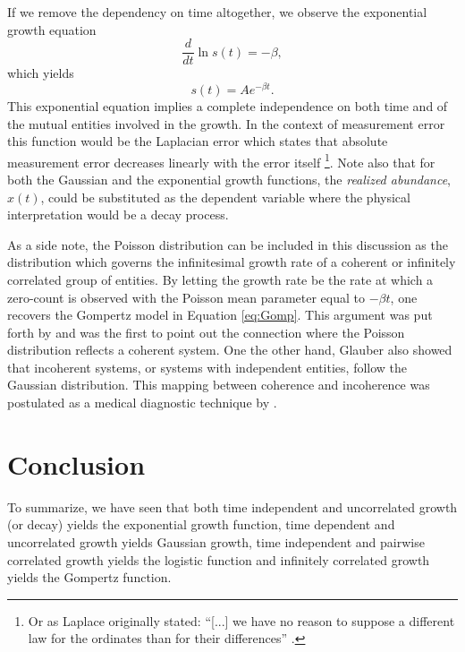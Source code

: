 \documentclass{article}
\begin{document}
If we remove the dependency on time altogether, we observe the exponential growth equation
\begin{equation}
  \frac{d}{dt}\ln s(t) = - \beta,
\end{equation}
which yields 
\begin{equation}
  s(t) = A e^{ - \beta t}.
\end{equation}
This exponential equation implies a complete independence on both time and of the mutual entities involved in the growth. In the context of measurement error this function would be the Laplacian error which states that absolute measurement error decreases linearly with the error itself \footnote{Or as Laplace originally stated: ``[...] we have no reason to suppose a different law for the ordinates than for their differences'' \cite{stahl2006evolution}.}. Note also that for both the Gaussian and the exponential growth functions, the \textit{realized abundance}, $x(t)$, could be substituted as the dependent variable where the physical interpretation would be a decay process.

As a side note, the Poisson distribution can be included in this discussion as the distribution which governs the infinitesimal growth rate of a coherent or infinitely correlated group of entities. By letting the growth rate be the rate at which a zero-count is observed with the Poisson mean parameter equal to $-\beta t$, one recovers the Gompertz model in Equation \ref{eq:Gomp}. This argument was put forth by \citet{shklovskii2005simple} and \citet{glauber1963coherent} was the first to point out the connection where the Poisson distribution reflects a coherent system. One the other hand, Glauber also showed that incoherent systems, or systems with independent entities, follow the Gaussian distribution. This mapping between coherence and incoherence was postulated as a medical diagnostic technique by \citet{zhang1994log}.

\section{Conclusion}
\label{sec:discussion}

To summarize, we have seen that both time independent and uncorrelated growth (or decay) yields the exponential growth function, time dependent and uncorrelated growth yields Gaussian growth, time independent and pairwise correlated growth yields the logistic function and infinitely correlated growth yields the Gompertz function. 
\end{document}

